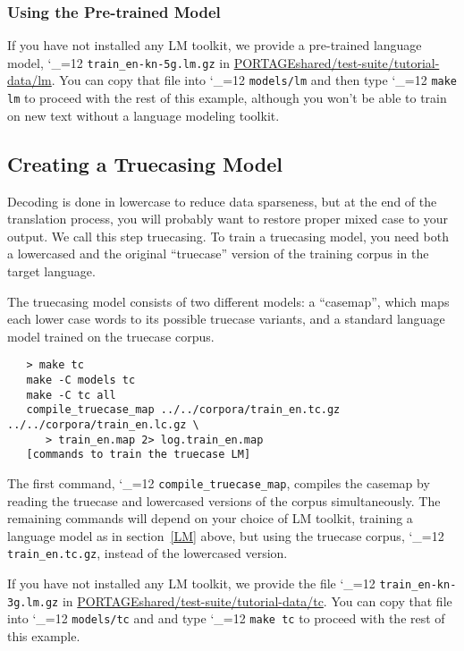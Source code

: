 \documentclass[11pt,letterpaper]{article}
\def\code{\begingroup\catcode`\_=12 \codex}
\newcommand{\codex}[1]{\texttt{#1}\endgroup}
\begin{document}
\subsubsection{Using the Pre-trained Model}

If you have not installed any LM toolkit, we provide a pre-trained
language model, \code{train_en-\linebreak[0]kn-5g.lm.gz} in
\url{PORTAGEshared/test-suite/tutorial-data/lm}. You can
copy that file into \code{models/lm} and then type \code{make lm} to
proceed with the rest of this example, although you won't be able to train on
new text without a language modeling toolkit.

\subsection{Creating a Truecasing Model} \label{TC}

Decoding is done in lowercase to reduce data sparseness, but at the end of the
translation process, you will probably want to restore proper mixed case to
your output.  We call this step truecasing.  To train a truecasing model, you
need both a lowercased and the original ``truecase'' version of the training
corpus in the target language.

The truecasing model consists of two different models: a ``casemap'', which
maps each lower case words to its possible truecase variants, and a standard
language model trained on the truecase corpus.

\begin{small}
\begin{verbatim}
   > make tc
   make -C models tc
   make -C tc all
   compile_truecase_map ../../corpora/train_en.tc.gz ../../corpora/train_en.lc.gz \
      > train_en.map 2> log.train_en.map
   [commands to train the truecase LM]
\end{verbatim}
\end{small}
The first command, \code{compile_truecase_map}, compiles the casemap
by reading the truecase and lowercased versions of the corpus simultaneously.
The remaining commands will depend on your choice of LM toolkit, training a
language model as in section~\ref{LM} above, but using the truecase corpus,
\code{train_en.tc.gz}, instead of the lowercased version.

If you have not installed any LM toolkit, we provide the file
\code{train_en-kn-3g.lm.gz} in
\url{PORTAGEshared/test-suite/tutorial-data/tc}.  You can
copy that file into \code{models/tc} and and type \code{make tc} to proceed
with the rest of this example.
\end{document}
